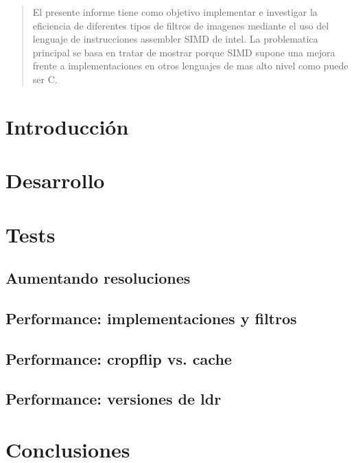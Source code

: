 \documentclass[a4paper]{article}
\begin{document}
\thispagestyle{empty}

\maketitle
\newpage

\thispagestyle{empty}
\vfill
\begin{abstract}
El presente informe tiene como objetivo implementar e investigar la eficiencia de diferentes tipos de filtros de imagenes mediante el uso del lenguaje de instrucciones assembler SIMD de intel. 
La problematica principal se basa en tratar de mostrar porque SIMD supone una mejora frente a implementaciones en otros lenguajes de mas alto nivel como puede ser C. 
\end{abstract}

\thispagestyle{empty}
\vspace{3cm}
\tableofcontents
\newpage


\newpage

\section{Introducción}


\section{Desarrollo}


\section{Tests}

\subsection{Aumentando resoluciones}


\subsection{Performance: implementaciones y filtros}


\subsection{Performance: cropflip vs. cache}


\subsection{Performance: versiones de ldr}


\section{Conclusiones}

\end{document}

